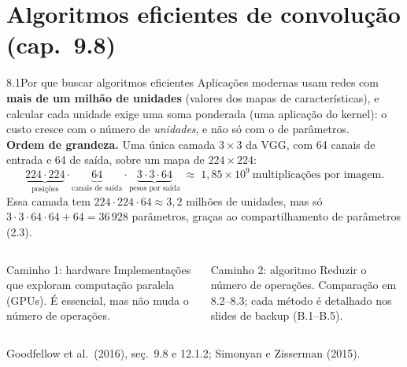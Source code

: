 \documentclass[aspectratio=169,11pt]{beamer}
\begin{document}
\section[8.\enspace Algoritmos eficientes de convolução (cap.~9.8)]{Algoritmos eficientes de convolução \textcolor{cinza}{(cap.~9.8)}}

\begin{frame}{8.1\enspace Por que buscar algoritmos eficientes}
  \small
  Aplicações modernas usam redes com \textbf{mais de um milhão de unidades} (valores dos mapas de características),
  e calcular cada unidade exige uma soma ponderada (uma aplicação do kernel): o custo cresce com o número de \emph{unidades}, e não só com o de parâmetros.\\[0.6em]
  \textbf{Ordem de grandeza.} Uma única camada $3\times3$ da VGG, com 64 canais de entrada e 64 de saída, sobre um mapa de $224\times224$:
  \[
    \underbrace{224\cdot 224}_{\text{posições}}\cdot\underbrace{64}_{\text{canais de saída}}\cdot
    \underbrace{3\cdot 3\cdot 64}_{\text{pesos por saída}}\;\approx\;1{,}85\times10^{9}\ \text{multiplicações por imagem.}
  \]
  \vspace{-0.3em}
  {\footnotesize Essa camada tem $224\cdot224\cdot64\approx3{,}2$ milhões de unidades, mas só $3\cdot3\cdot64\cdot64+64=36\,928$ parâmetros,
  graças ao compartilhamento de parâmetros (2.3).}
  \vspace{-0.4em}
  \begin{columns}[T]
    \begin{block}{Caminho 1: hardware}
      \footnotesize Implementações que exploram computação paralela (GPUs). É essencial, mas não muda o número de operações.
    \end{block}
    \begin{block}{Caminho 2: algoritmo}
      \footnotesize Reduzir o número de operações. Comparação em 8.2--8.3; cada método é detalhado nos slides de backup (B.1--B.5).
    \end{block}
  \end{columns}
  {\footnotesize\textcolor{cinza}{Goodfellow et al.\ (2016), seç.~9.8 e 12.1.2; Simonyan e Zisserman (2015).}}
\end{frame}
\end{document}
